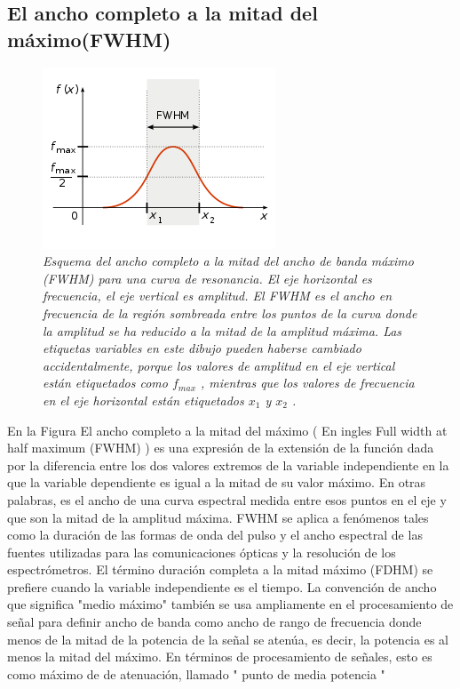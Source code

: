 \documentclass[a4paper,11pt,]{book}
\begin{document}
\subsection{El ancho completo a la mitad del máximo(FWHM)}
\begin{figure}[H]
	\centering
	\includegraphics[scale=1]{../Images/fwhm}
	\caption{\emph{Esquema del ancho completo a la mitad del ancho de banda máximo (FWHM) para una curva de resonancia. El eje horizontal es frecuencia, el eje vertical es amplitud. El FWHM es el ancho en frecuencia de la región sombreada entre los puntos de la curva donde la amplitud se ha reducido a la mitad de la amplitud máxima. Las etiquetas variables en este dibujo pueden haberse cambiado accidentalmente, porque los valores de amplitud en el eje vertical están etiquetados como $f_{max}$ , mientras que los valores de frecuencia en el eje horizontal están etiquetados $x_1$ y $x_2$ .}}
\end{figure}
En la Figura El ancho completo a la mitad del máximo ( En ingles Full width at half maximum (FWHM) ) es una expresión de la extensión de la función dada por la diferencia entre los dos valores extremos de la variable independiente en la que la variable dependiente es igual a la mitad de su valor máximo. En otras palabras, es el ancho de una curva espectral medida entre esos puntos en el eje y que son la mitad de la amplitud máxima. FWHM se aplica a fenómenos tales como la duración de las formas de onda del pulso y el ancho espectral de las fuentes utilizadas para las comunicaciones ópticas y la resolución de los espectrómetros. El término duración completa a la mitad máximo (FDHM) se prefiere cuando la variable independiente es el tiempo. La convención de ancho que significa "medio máximo" también se usa ampliamente en el procesamiento de señal para definir ancho de banda como ancho de rango de frecuencia donde menos de la mitad de la potencia de la señal se atenúa, es decir, la potencia es al menos la mitad del máximo. En términos de procesamiento de señales, esto es como máximo de de atenuación, llamado " punto de media potencia "
\end{document}
